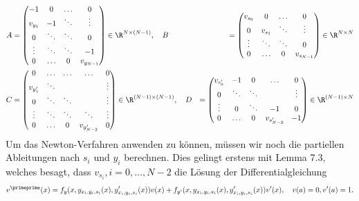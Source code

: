 \begin{solution}
\begin{align*}
    A &= \begin{pmatrix}
    -1 & 0 & \hdots & 0\\
      v_{y_1} & -1 & \ddots & \vdots\\
      0 & \ddots & \ddots & 0\\
      \vdots & \ddots & \ddots & -1\\
      0 & \hdots & 0 & v_{y_{N-1}}\\
  \end{pmatrix} \in \R^{N \times (N-1)}, \quad
  B &= \begin{pmatrix}
  v_{s_0} & 0 & \hdots & 0 \\
   0 & v_{s_1} & \ddots & \vdots\\
   \vdots & \ddots & \ddots & 0 \\
   0 & \hdots & 0 & v_{s_{N-1}}\\
\end{pmatrix} \in \R^{N \times N} \\
C &= \begin{pmatrix}
 0 &\hdots & \hdots & \hdots & 0\\
 v_{y^{\prime}_1} & \ddots & & & \vdots\\
 0 & \ddots &  \ddots& & \vdots \\
 \vdots & \ddots & \ddots &  \ddots & \vdots\\
 0 & \hdots & 0 & v_{y^{\prime}_{N-2}} & 0 \\
\end{pmatrix} \in \R^{(N-1)\times(N-1)}, \quad
D &= \begin{pmatrix}
  v_{s^{\prime}_0} & -1 & 0 & \hdots & 0\\
  0 & \ddots & \ddots  & & \vdots \\
  \vdots & 0 & \ddots & -1 & 0\\
  0 & \hdots & 0 & v_{s^{\prime}_{N-2}} & -1\\
\end{pmatrix} \in \R^{(N-1)\times N}
  \end{align*}
Um das Newton-Verfahren anwenden zu können, müssen wir noch die partiellen
Ableitungen nach $s_i$ und $y_i$ berechnen. Dies gelingt erstens mit Lemma 7.3, welches
besagt, dass $v_{s_i}, i = 0,\dots,N-2$ die Lösung der Differentialgleichung
\begin{align*}
  v^{\primeprime}(x) = f_y(x,y_{x_i,y_i,s_i}(x),y_{x_i,y_i,s_i}^{\prime}(x))v(x)
  + f_{y^{\prime}}(x,y_{x_i,y_i,s_i}(x),y_{x_i,y_i,s_i}^{\prime}(x))v^{\prime}(x), \quad v(a) = 0, v^{\prime}(a) = 1.
\end{align*}

\end{solution}

